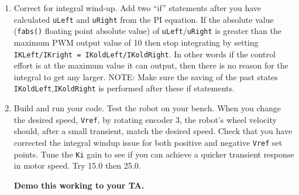 \documentclass[11pt]{article}
\begin{document}
\begin{enumerate}
\begin{enumerate}
                \begin{checkoff}
                        What happens to \texttt{IKLeft} and \texttt{IKRight} the longer you wait to turn on the motor amp? \textbf{Demo this to your TA.}
                \end{checkoff}
        \end{enumerate}
        \item Correct for integral wind-up. Add two “if” statements after you have calculated \texttt{uLeft} and \texttt{uRight} from the PI equation. If the absolute value (\texttt{fabs()} floating point absolute value) of \texttt{uLeft}/\texttt{uRight} is greater than the maximum PWM output value of 10 then stop integrating by setting \texttt{IKLeft/IKright = IKoldLeft/IKoldRight}. In other words if the control effort is at the maximum value it can output, then there is no reason for the integral to get any larger. NOTE: Make sure the saving of the past states \texttt{IKoldLeft},\texttt{IKoldRight} is performed after these if statements.
        \item Build and run your code. Test the robot on your bench. When you change the desired speed, \texttt{Vref}, by rotating encoder 3, the robot’s wheel velocity should, after a small transient, match the desired speed. Check that you have corrected the integral windup issue for both positive and negative \texttt{Vref} set points. Tune the \texttt{Ki} gain to see if you can achieve a quicker transient response in motor speed. Try 15.0 then 25.0.
        \begin{checkoff}
                \textbf{Demo this working to your TA.}
        \end{checkoff}
\end{enumerate}
%
\end{document}
